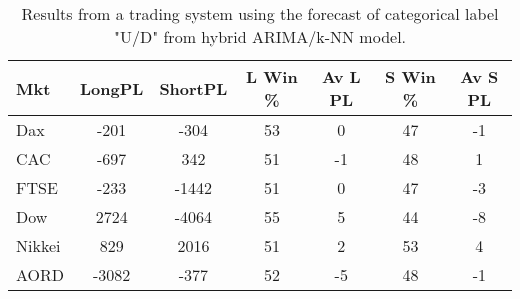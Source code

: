 \begin{table}[ht]
\centering
\caption[Results from a trading system using the forecast of categorical label "U/D" from hybrid ARIMA/k-NN model]{Results from a trading system using the forecast of categorical label "U/D" from hybrid ARIMA/k-NN model.} 
\label{tab:chp_ts:pUD_CAT_arima_knn_sys}
\begin{tabular}{lcccccc}
  \toprule Mkt & LongPL & ShortPL & L Win \% & Av L PL & S Win \% & Av S PL \\ 
  \midrule Dax & -201 & -304 & 53 & 0 & 47 & -1 \\ 
  CAC & -697 & 342 & 51 & -1 & 48 & 1 \\ 
  FTSE & -233 & -1442 & 51 & 0 & 47 & -3 \\ 
  Dow & 2724 & -4064 & 55 & 5 & 44 & -8 \\ 
  Nikkei & 829 & 2016 & 51 & 2 & 53 & 4 \\ 
  AORD & -3082 & -377 & 52 & -5 & 48 & -1 \\ 
   \bottomrule \end{tabular}
\end{table}
